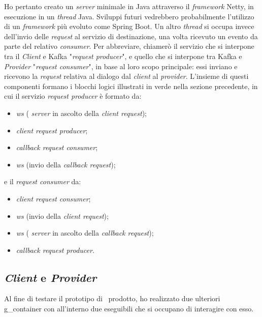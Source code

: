 Ho pertanto creato un  \textit{server} minimale in Java attraverso il \textit{framework} Netty, in esecuzione in un \textit{thread} Java.
Sviluppi futuri vedrebbero probabilmente l'utilizzo di un \textit{framework} più evoluto come Spring Boot.
Un altro \textit{thread} si occupa invece dell'invio delle  \textit{request} al servizio di destinazione, una volta ricevuto un evento da parte del relativo \textit{consumer}.
Per abbreviare, chiamerò il servizio che si interpone tra il  \textit{Client} e Kafka "\textit{request producer}", e quello che si interpone tra Kafka e  \textit{Provider} "\textit{request consumer}", in base al loro scopo principale: essi inviano e ricevono la \textit{request} relativa al dialogo dal \textit{client} al \textit{provider}.
\noindent
L'insieme di questi componenti formano i blocchi logici illustrati in verde nella sezione precedente, in cui il servizio \textit{request producer} è formato da:
\begin{itemize}
  \item {} \textit{\acrlong{ws}} ( \textit{server} in ascolto della \textit{client request});
  \item \textit{client request producer};
  \item \textit{callback request consumer};
  \item {} \textit{\acrlong{ws}} (invio della \textit{callback request});
\end{itemize}
\noindent
e il \textit{request consumer} da:
\begin{itemize}
  \item \textit{client request consumer};
  \item {} \textit{\acrlong{ws}} (invio della \textit{client request});
  \item {} \textit{\acrlong{ws}} ( \textit{server} in ascolto della \textit{callback request});
  \item \textit{callback request producer}.
\end{itemize}

\subsection{ \textit{Client} e  \textit{Provider} }

Al fine di testare il prototipo di \middleware\ prodotto, ho realizzato due ulteriori \gls{g_container} con all'interno due eseguibili che si occupano di interagire con esso.


